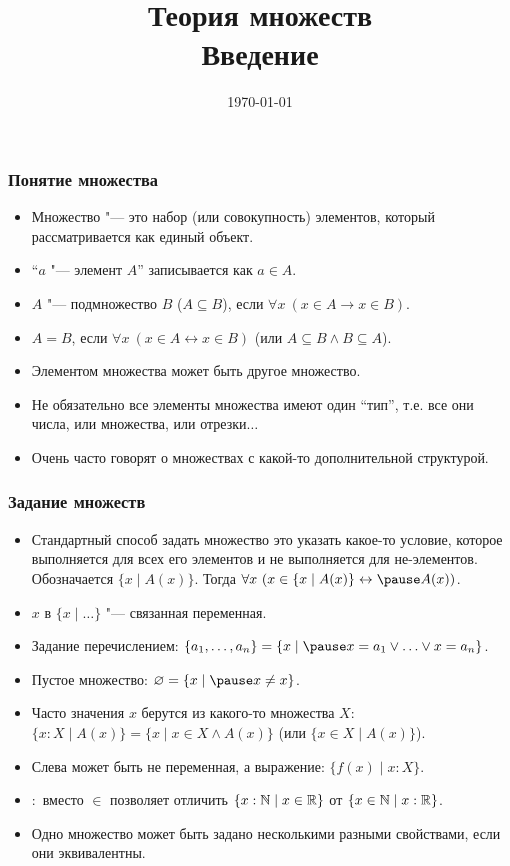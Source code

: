 \documentclass[10pt]{beamer}
\title{Теория множеств\\Введение}
\date{\today}
\begin{document}
\begin{frame}[plain]
\maketitle
\end{frame}

\begin{frame}
    \frametitle{Понятие множества}
    \begin{itemize}
        \item Множество "--- это набор (или совокупность) элементов, который рассматривается как единый объект.
        \item \enquote{$a$ "--- элемент $A$} записывается как $a \in A$.
        \item $A$ "--- подмножество $B$ ($A \subseteq B$), если \pause $\forall x ~ (x \in A \to x \in B)$.
        \item $A = B$, если \pause $\forall x ~ (x \in A \leftrightarrow x \in B)$ (или $A \subseteq B \land B \subseteq A$).
        \item Элементом множества может быть другое множество.
        \item Не обязательно все элементы множества имеют один \enquote{тип}, т.е. все они числа, или множества, или отрезки$\ldots$
        \item Очень часто говорят о множествах с какой-то дополнительной структурой.
    \end{itemize}
\end{frame}

\begin{frame}
    \frametitle{Задание множеств}
    \begin{itemize}
        \item Стандартный способ задать множество это указать какое-то условие, которое выполняется для всех его элементов и не выполняется для не-элементов. Обозначается $\{x \mid A(x)\}$. Тогда $\forall x ~ (x \in \{x \mid A(x)\} \leftrightarrow \pause A(x))$.
        \item $x$ в $\{x \mid \ldots\}$ "--- связанная переменная.
        \item Задание перечислением: $\{a_1,\ldots,a_n\} = \{x \mid \pause x = a_1 \lor \ldots \lor x = a_n \}$.
        \item Пустое множество: $\varnothing = \{x \mid \pause x \neq x\}$.
        \item Часто значения $x$ берутся из какого-то множества $X$: $\{x : X \mid A(x)\} = \{x \mid x \in X \land A(x)\}$ (или $\{x \in X \mid A(x)\}$).
        \item Слева может быть не переменная, а выражение: $\{ f(x) \mid x : X\}$.
        \item $:$ вместо $\in$ позволяет отличить $\{x : \mathbb{N} \mid x \in \mathbb{R}\}$ от $\{x \in \mathbb{N} \mid x : \mathbb{R}\}$.
        \item Одно множество может быть задано несколькими разными свойствами\pause, если они эквивалентны.
    \end{itemize}
\end{frame}
\end{document}
